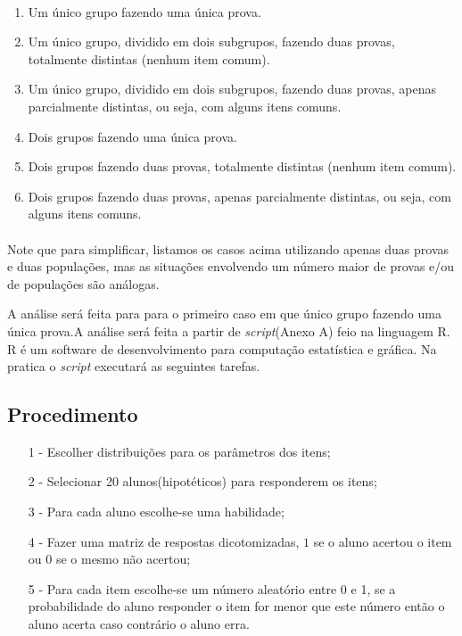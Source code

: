     \paragraph{}
	\begin{enumerate}
		\item Um único grupo fazendo uma única prova. 
		\item Um único grupo, dividido em dois subgrupos, fazendo duas provas, totalmente distintas (nenhum item comum). 
		\item Um único grupo, dividido em dois subgrupos, fazendo duas provas, apenas parcialmente distintas, ou seja, com alguns itens comuns. 
		\item Dois grupos fazendo uma única prova. 
		\item Dois grupos fazendo duas provas, totalmente distintas (nenhum item comum). 
		\item Dois grupos fazendo duas provas, apenas parcialmente distintas, ou seja, com alguns itens comuns.
	\end{enumerate} 
	\paragraph{}
	    Note que para simplificar, listamos os casos acima utilizando apenas duas provas e duas populações, mas as situações envolvendo um número maior de provas e/ou de populações são análogas.
	\par
    	A análise será feita para para o primeiro caso em que único grupo fazendo uma única prova.A análise será feita a partir de \textit{script}(Anexo  A) feio na linguagem R. R é um software de desenvolvimento para computação estatística e gráfica.
    	Na pratica o \textit{script} executará as seguintes tarefas.
    \subsection{Procedimento}
	\begin{enumerate}
		\item[1 - ] Escolher distribuições para os parâmetros dos itens;
		\item[2 - ] Selecionar 20 alunos(hipotéticos) para responderem os itens;
		\item[3 - ] Para cada aluno escolhe-se uma habilidade;
		\item[4 - ] Fazer uma matriz de respostas dicotomizadas, $1$ se o aluno acertou o item ou $0$ se o mesmo não acertou;
		\item[5 - ] Para cada item escolhe-se um número aleatório entre 0 e 1, se a probabilidade do aluno responder o item for menor que este número então o aluno acerta caso contrário o aluno erra.
	\end{enumerate}
